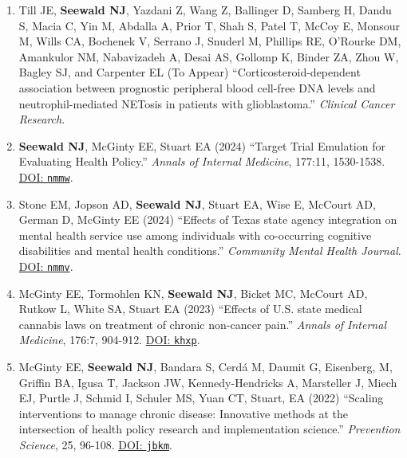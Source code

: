 \documentclass[letterpaper,11pt]{article} %
\begin{document}
	\begin{enumerate}
    
        \item Till JE, \textbf{Seewald NJ}, Yazdani Z, Wang Z, Ballinger D, Samberg H, Dandu S, Macia C, Yin M, Abdalla A, Prior T, Shah S, Patel T, McCoy E, Monsour M, Wills CA, Bochenek V, Serrano J, Snuderl M, Phillips RE, O'Rourke DM, Amankulor NM, Nabavizadeh A, Desai AS, Gollomp K, Binder ZA, Zhou W, Bagley SJ, and Carpenter EL (To Appear) ``Corticosteroid-dependent association between prognostic peripheral blood cell-free DNA levels and neutrophil-mediated NETosis in patients with glioblastoma.'' \textit{Clinical Cancer Research}.
        
		\item \textbf{Seewald NJ}, McGinty EE, Stuart EA (2024) ``Target Trial Emulation for Evaluating Health Policy.'' \textit{Annals of Internal Medicine}, 177:11, 1530-1538. \href{https://doi.org/nmmw}{DOI: \texttt{nmmw}}.
		
		\item Stone EM, Jopson AD, \textbf{Seewald NJ}, Stuart EA, Wise E, McCourt AD, German D, McGinty EE (2024) ``Effects of Texas state agency integration on mental health service use among individuals with co-occurring cognitive disabilities and mental health conditions.'' \textit{Community Mental Health Journal}. \href{https://doi.org/nmmv}{DOI: \texttt{nmmv}}.
		
		\item McGinty EE, Tormohlen KN, \textbf{Seewald NJ}, Bicket MC, McCourt AD, Rutkow L, White SA, Stuart EA (2023) ``Effects of U.S. state medical cannabis laws on treatment of chronic non-cancer pain.'' \textit{Annals of Internal Medicine}, 176:7, 904-912. \href{https://doi.org/khxp}{DOI: \texttt{khxp}}.
		
		\item McGinty EE, \textbf{Seewald NJ}, Bandara S, Cerd\'{a} M, Daumit G, Eisenberg, M, Griffin BA, Igusa T, Jackson JW, Kennedy-Hendricks A, Marsteller J, Miech EJ, Purtle J, Schmid I, Schuler MS, Yuan CT, Stuart, EA (2022) ``Scaling interventions to manage chronic disease: Innovative methods at the intersection of health policy research and implementation science.'' \textit{Prevention Science}, 25, 96-108. \href{https://doi.org/jbkm}{DOI: \texttt{jbkm}}.
		

\end{enumerate}
\end{document}
